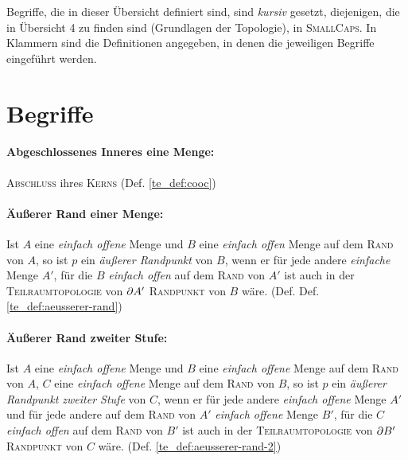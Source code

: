 

\newcommand{\overviewnumber}{5}
\newcommand{\overviewname}{Weitere topologische Begriffe}



\noindent
Begriffe, die in dieser Übersicht definiert sind, sind \textit{kursiv} gesetzt, diejenigen, die in Übersicht 4 zu finden sind (Grundlagen der Topologie), in \textsc{SmallCaps}. In Klammern sind die Definitionen angegeben, in denen die jeweiligen Begriffe eingeführt werden.

\section*{Begriffe}

    \paragraph{Abgeschlossenes Inneres eine Menge:} \textsc{Abschluss} ihres \textsc{Kerns} (Def. \ref{te_def:cooc})
    
    \paragraph{Äußerer Rand einer Menge:} Ist $A$ eine \textit{einfach offene} Menge und $B$ eine \textit{einfach offen} Menge auf dem \textsc{Rand} von $A$, so ist $p$ ein \textit{äußerer Randpunkt} von $B$, wenn er für jede andere \textit{einfache} Menge $A'$, für die $B$ \textit{einfach offen} auf dem \textsc{Rand} von $A'$ ist auch in der \textsc{Teilraumtopologie} von $\partial A'$ \textsc{Randpunkt} von $B$ wäre. (Def. Def. \ref{te_def:aeusserer-rand})
    
    \paragraph{Äußerer Rand zweiter Stufe:} Ist $A$ eine \textit{einfach offene} Menge und $B$ eine \textit{einfach offene} Menge auf dem \textsc{Rand} von $A$, $C$ eine \textit{einfach offene} Menge auf dem \textsc{Rand} von $B$, so ist $p$ ein \textit{äußerer Randpunkt zweiter Stufe} von $C$, wenn er für jede andere \textit{einfach offene} Menge $A'$ und für jede andere auf dem \textsc{Rand} von $A'$ \textit{einfach offene} Menge $B'$, für die $C$ \textit{einfach offen} auf dem \textsc{Rand} von $B'$ ist auch in der \textsc{Teilraumtopologie} von $\partial B'$ \textsc{Randpunkt} von $C$ wäre.  (Def. \ref{te_def:aeusserer-rand-2})

